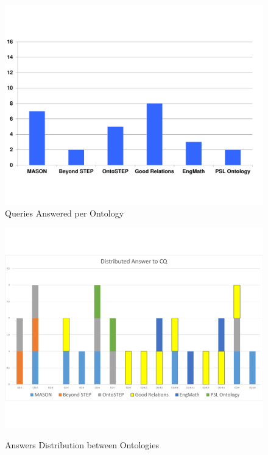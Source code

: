 \begin{figure}
	\centering
	\scriptsize
	\begin{minipage}{.5\textwidth}
		\includegraphics[scale=0.3]{figure-chapterIV/fig4-6.pdf}\\
		\caption{Queries Answered per Ontology}
		\label{figure4-6}
	\end{minipage}%
	\begin{minipage}{.5\textwidth}
		\includegraphics[scale=0.3]{figure-chapterIV/fig4-7}\\
		\caption{Answers Distribution between Ontologies}
		\label{figure4-7}
	\end{minipage}%
\end{figure}





